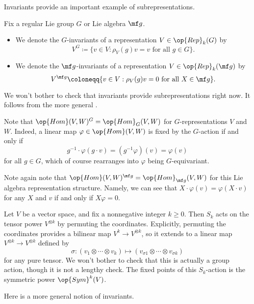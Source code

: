 \documentclass[../notes.tex]{subfiles}
\begin{document}
Invariants provide an important example of subrepresentations.
\begin{definition}[invariants]
	Fix a regular Lie group $G$ or Lie algebra $\mf g$.
	\begin{itemize}
		\item We denote the $G$-invariants of a representation $V\in\op{Rep}_k(G)$ by
		\[V^G\coloneqq\{v\in V:\rho_V(g)v=v\text{ for all }g\in G\}.\]
		\item We denote the $\mf g$-invariants of a representation $V\in\op{Rep}_k(\mf g)$ by
		\[V^{\mf g}\coloneqq\{v\in V:\rho_V(g)v=0\text{ for all }X\in\mf g\}.\]
	\end{itemize}
\end{definition}
\begin{remark}
	We won't bother to check that invariants provide subrepresentations right now. It follows from the more general .
\end{remark}
\begin{example}
	Note that $\op{Hom}(V,W)^G=\op{Hom}_G(V,W)$ for $G$-representations $V$ and $W$. Indeed, a linear map $\varphi\in\op{Hom}(V,W)$ is fixed by the $G$-action if and only if
	\[g^{-1}\cdot\varphi(g\cdot v)=\left(g^{-1}\varphi\right)(v)=\varphi(v)\]
	for all $g\in G$, which of course rearranges into $\varphi$ being $G$-equivariant.
\end{example}
\begin{example}
	Note again note that $\op{Hom}(V,W)^{\mf g}=\op{Hom}_{\mf g}(V,W)$ for this Lie algebra representation structure. Namely, we can see that $X\cdot\varphi(v)=\varphi(X\cdot v)$ for any $X$ and $v$ if and only if $X\varphi=0$.
\end{example}
\begin{example}
	Let $V$ be a vector space, and fix a nonnegative integer $k\ge0$. Then $S_k$ acts on the tensor power $V^{\otimes k}$ by permuting the coordinates. Explicitly, permuting the coordinates provides a bilinear map $V^k\to V^{\otimes k}$, so it extends to a linear map $V^{\otimes k}\to V^{\otimes k}$ defined by
	\[\sigma\colon (v_1\otimes\cdots\otimes v_k)\mapsto(v_{\sigma1}\otimes\cdots\otimes v_{\sigma k})\]
	for any pure tensor. We won't bother to check that this is actually a group action, though it is not a lengthy check. The fixed points of this $S_k$-action is the symmetric power $\op{Sym}^k(V)$.
\end{example}
Here is a more general notion of invariants.
\end{document}
